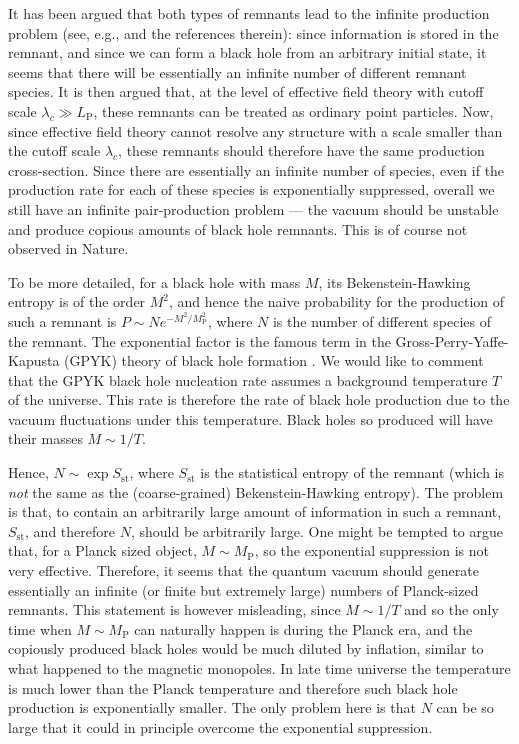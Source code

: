 \documentclass[12pt]{article}
\newcommand{\2}{$^2$}
\newcommand{\3}{$^3$}
\newcommand{\4}{$_4$}
\newcommand{\5}{$_5$}
\begin{document}
It has been argued that both types of remnants lead to the infinite production problem (see, e.g., \cite{Giddings3} and the references therein): since information is stored in the remnant, and since we can form a black hole from an arbitrary initial state, it seems that there will be essentially an infinite number of different remnant species. It is then argued that, at the level of effective field theory with cutoff scale $\lambda_c \gg L_{\text{P}}$, these remnants can be treated as ordinary point particles. Now, since effective field theory cannot resolve any structure with a scale smaller than the cutoff scale $\lambda_c$, these remnants should therefore have the same production cross-section. Since there are essentially an infinite number of species, even if the production rate for each of these species is exponentially suppressed, overall we still have an infinite pair-production problem --- the vacuum should be unstable and produce copious amounts of black hole remnants. This is of course not observed in Nature. 

To be more detailed, for a black hole with mass $M$, its Bekenstein-Hawking entropy is of the order $M^{2}$, and hence the naive probability for the production of such a remnant is $P \sim N e^{-M^{2}/M_{\text{P}}^2}$, where $N$ is the number of different species of the remnant. The exponential factor is the famous term in the Gross-Perry-Yaffe-Kapusta (GPYK) theory of black hole formation \cite{grossperryyaffe, kapusta}. We would like to comment that the GPYK black hole nucleation rate assumes a background temperature $T$ of the universe. This rate is therefore the rate of black hole production due to the vacuum fluctuations under this temperature. Black holes so produced will have their masses $M \sim 1/T$. 

Hence, $N \sim \exp S_{\mathrm{st}}$, where $S_{\mathrm{st}}$ is the statistical entropy of the remnant (which is \emph{not} the same as the (coarse-grained) Bekenstein-Hawking entropy). The problem is that, to contain an arbitrarily large amount of information in such a remnant, $S_{\mathrm{st}}$, and therefore $N$, should be arbitrarily large. One might be tempted to argue that, for a Planck sized object, $M \sim M_{\text{P}}$, so the exponential suppression is not very effective. Therefore, it seems that the quantum vacuum should generate essentially an infinite (or finite but extremely large) numbers of Planck-sized remnants. This statement is however misleading, since $M \sim 1/T$ and so the only time when $M \sim M_{\text{P}}$ can naturally happen is during the Planck era, and the copiously produced black holes would be much diluted by inflation, similar to what happened to the magnetic monopoles. In late time universe the temperature is much lower than the Planck temperature and therefore such black hole production is exponentially smaller. The only problem here is that $N$ can be so large that it could in principle overcome the exponential suppression. 
\end{document}
